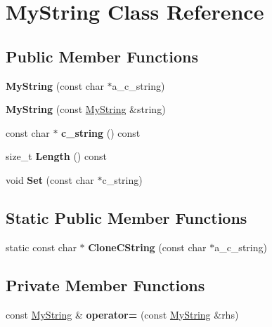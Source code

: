 \hypertarget{class_my_string}{}\section{My\+String Class Reference}
\label{class_my_string}
\subsection*{Public Member Functions}
\begin{DoxyCompactItemize}
\item 
\mbox{\label{class_my_string_a28134eb91b6698f46b12accefa157d0f}} 
{\bfseries My\+String} (const char $\ast$a\+\_\+c\+\_\+string)
\item 
\mbox{\label{class_my_string_ae24c7cf89a58dd2287303df2ac054c66}} 
{\bfseries My\+String} (const \mbox{\hyperlink{class_my_string}{My\+String}} \&string)
\item 
\mbox{\label{class_my_string_aff2af0cf30db39fe24a235670ee6ff25}} 
const char $\ast$ {\bfseries c\+\_\+string} () const
\item 
\mbox{\label{class_my_string_a4eb168b1ec401a732b3859abe004d648}} 
size\+\_\+t {\bfseries Length} () const
\item 
\mbox{\label{class_my_string_a521c4cd7eccac6ce554d8a51505e4970}} 
void {\bfseries Set} (const char $\ast$c\+\_\+string)
\end{DoxyCompactItemize}
\subsection*{Static Public Member Functions}
\begin{DoxyCompactItemize}
\item 
\mbox{\label{class_my_string_a40753dcfa3314a8993f32bdd75d67ce2}} 
static const char $\ast$ {\bfseries Clone\+C\+String} (const char $\ast$a\+\_\+c\+\_\+string)
\end{DoxyCompactItemize}
\subsection*{Private Member Functions}
\begin{DoxyCompactItemize}
\item 
\mbox{\label{class_my_string_a0156d24764b9d8e4303763750f95cd38}} 
const \mbox{\hyperlink{class_my_string}{My\+String}} \& {\bfseries operator=} (const \mbox{\hyperlink{class_my_string}{My\+String}} \&rhs)
\end{DoxyCompactItemize}
